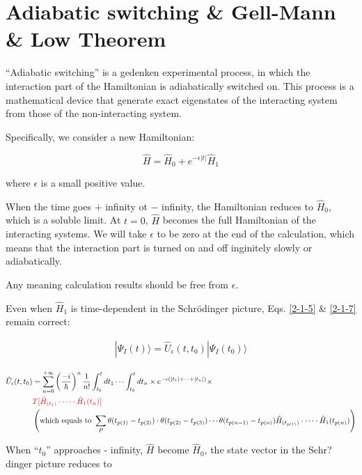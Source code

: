 \section{Adiabatic switching \& Gell-Mann \& Low Theorem}

``Adiabatic switching'' is a gedenken experimental process, in which the interaction part of the Hamiltonian is adiabatically switched on. This process is a mathematical device that generate exact eigenstates of the interacting system from those of the non-interacting system. 

Specifically, we consider a new Hamiltonian:

\[\hat{H}=\hat{H}_0+e^{-\epsilon|t|}\hat{H}_1 \]

where $\epsilon$ is a small positive value. 

When the time goes $+$ infinity ot $-$ infinity, the Hamiltonian reduces to $\hat{H}_0$, which is a soluble limit. At $t=0$, $\hat{H}$ becomes the full Hamiltonian of the interacting systems. We will take $\epsilon$ to be zero at the end of the calculation, which means that the interaction part is turned on and off inginitely slowly or adiabatically. 

Any meaning calculation results should be free from $\epsilon$. 

Even when $\hat{H}_1$ is time-dependent in the Schr\"{o}dinger picture, Eqs. \eqref{2-1-5} \& \eqref{2-1-7} remain correct:

\begin{align}
|\Psi_I(t)\rangle=\hat{U}_\epsilon(t,t_0)|\Psi_I(t_0)\rangle
\end{align}

\begin{align}\label{2-2-2}
\hat{U}_\epsilon(t,t_0)&=\sum_{n=0}^{+\infty}\left(\frac{-i}{\hbar}\right)^n\frac{1}{n!}\int_{t_0}^t dt_1 \cdots \int_{t_0}^t dt_n\times e^{-\epsilon(|t_1|+\cdots+|t_n|)}\times\\
\nonumber&{\color{red}{T[\hat{H}_{(t_1)}\cdot\cdots\cdot\hat{H}_1(t_n)]}}\\
\nonumber&\left(\text{which equals to\ }\sum_P\theta(t_{p(1)}-t_{p(2)})\cdot\theta(t_{p(2)}-t_{p(3)})\cdots\theta(t_{p(n-1)}-t_{p(n)}) \hat{H}_{(t_{p(1)})}\cdot\cdots\cdot\hat{H}_1(t_{p(n)})\right)
\end{align}



When ``$t_0$'' approaches - infinity, $\hat{H}$ become $\hat{H}_0$, the state vector in the Schr?dinger picture reduces to

